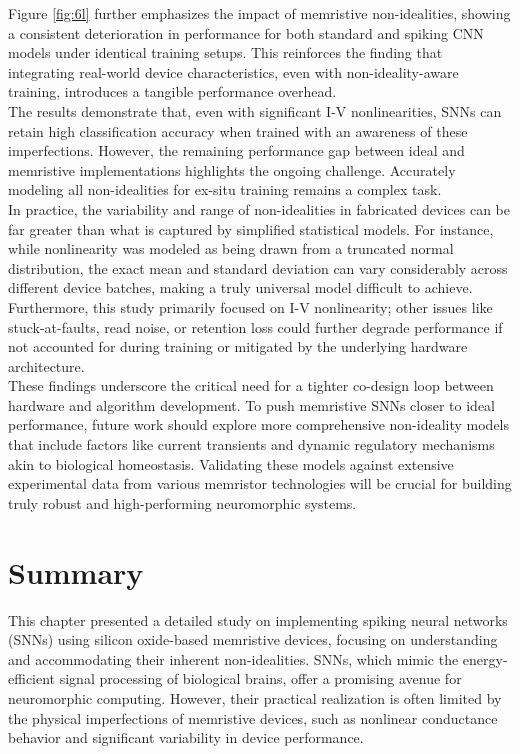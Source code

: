\noindent Figure \ref{fig:6l} further emphasizes the impact of memristive non-idealities, showing a consistent deterioration in performance for both standard and spiking CNN models under identical training setups. This reinforces the finding that integrating real-world device characteristics, even with non-ideality-aware training, introduces a tangible performance overhead.\\

\noindent The  results demonstrate that, even with significant I-V nonlinearities, SNNs can retain high classification accuracy when trained with an awareness of these imperfections. However, the remaining performance gap between ideal and memristive implementations highlights the ongoing challenge. Accurately modeling all non-idealities for ex-situ training remains a complex task. \\

\noindent In practice, the variability and range of non-idealities in fabricated devices can be far greater than what is captured by simplified statistical models. For instance, while nonlinearity was modeled as being drawn from a truncated normal distribution, the exact mean and standard deviation can vary considerably across different device batches, making a truly universal model difficult to achieve. Furthermore, this study primarily focused on I-V nonlinearity; other issues like stuck-at-faults, read noise, or retention loss could further degrade performance if not accounted for during training or mitigated by the underlying hardware architecture.\\

\noindent These findings underscore the critical need for a tighter co-design loop between hardware and algorithm development. To push memristive SNNs closer to ideal performance, future work should explore more comprehensive non-ideality models that include factors like current transients and dynamic regulatory mechanisms akin to biological homeostasis. Validating these models against extensive experimental data from various memristor technologies will be crucial for building truly robust and high-performing neuromorphic systems.

\section[Summary]{Summary}

This chapter presented a detailed study on implementing spiking neural networks (SNNs) using silicon oxide-based memristive devices, focusing on understanding and accommodating their inherent non-idealities. SNNs, which mimic the energy-efficient signal processing of biological brains, offer a promising avenue for neuromorphic computing. However, their practical realization is often limited by the physical imperfections of memristive devices, such as nonlinear conductance behavior and significant variability in device performance.\\

